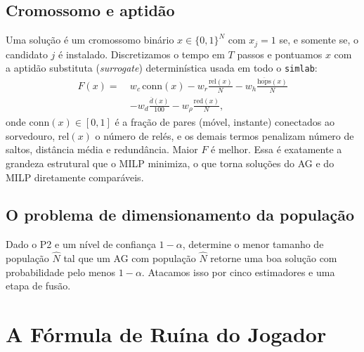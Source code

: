 \documentclass[conference]{IEEEtran}
\newcommand{\Nhat}{\hat{N}}
\begin{document}
\subsection{Cromossomo e aptidão}
Uma solução é um cromossomo binário $x\in\{0,1\}^{N}$ com $x_j=1$ se, e somente se,
o candidato $j$ é instalado. Discretizamos o tempo em $T$ passos e pontuamos $x$
com a aptidão substituta (\emph{surrogate}) determinística usada em todo o
\texttt{simlab}:
\begin{align}
F(x) =\ & w_c\,\mathrm{conn}(x) - w_r\tfrac{\mathrm{rel}(x)}{N}
        - w_h\tfrac{\overline{\mathrm{hops}}(x)}{N} \nonumber\\
       & - w_d\tfrac{\overline{d}(x)}{100} - w_\rho\tfrac{\mathrm{red}(x)}{N},
\label{eq:fitness}
\end{align}
onde $\mathrm{conn}(x)\in[0,1]$ é a fração de pares (móvel, instante) conectados ao
sorvedouro, $\mathrm{rel}(x)$ o número de relés, e os demais termos penalizam
número de saltos, distância média e redundância. Maior $F$ é melhor. Essa é
exatamente a grandeza estrutural que o MILP minimiza, o que torna soluções do AG e
do MILP diretamente comparáveis.

\subsection{O problema de dimensionamento da população}
Dado o P2 e um nível de confiança $1-\alpha$, determine o menor tamanho de
população $\Nhat$ tal que um AG com população $\Nhat$ retorne uma boa solução com
probabilidade pelo menos $1-\alpha$. Atacamos isso por cinco estimadores e uma
etapa de fusão.

\section{A Fórmula de Ruína do Jogador}
\label{sec:gr}
\end{document}
